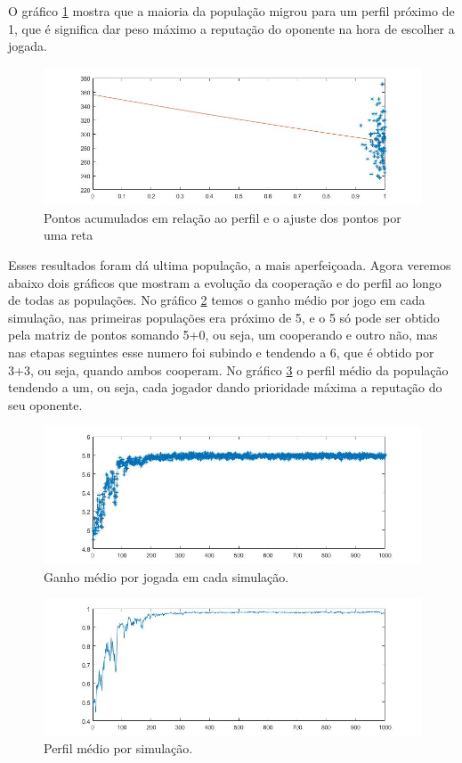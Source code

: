 O gráfico \ref{fig16} mostra que a maioria da população migrou para um perfil próximo de 1, que é significa dar peso máximo a reputação do oponente na hora de escolher a jogada.

\begin{figure}[H]
\centering
\includegraphics[width=14cm]{imagens/graf16.jpg}
\caption{Pontos acumulados em relação ao perfil e o ajuste dos pontos por uma reta}
\label{fig16}
\end{figure}

Esses resultados foram dá ultima população, a mais aperfeiçoada. Agora veremos abaixo dois gráficos que mostram a evolução da cooperação e do perfil ao longo de todas as populações. No gráfico \ref{fig17} temos o ganho médio por jogo em cada simulação, nas primeiras populações era próximo de 5, e o 5 só pode ser obtido pela matriz de pontos somando 5+0, ou seja, um cooperando e outro não, mas nas etapas seguintes esse numero foi subindo e tendendo a 6, que é obtido por 3+3, ou seja, quando ambos cooperam. No gráfico \ref{fig18} o perfil médio da população tendendo a um, ou seja, cada jogador dando prioridade máxima a reputação do seu oponente.

\begin{figure}[H]
\centering
\includegraphics[width=14cm]{imagens/graf17.jpg}
\caption{Ganho médio por jogada em cada simulação.}
\label{fig17}
\end{figure}

\begin{figure}[H]
\centering
\includegraphics[width=14cm]{imagens/graf18.jpg}
\caption{Perfil médio por simulação.}
\label{fig18}
\end{figure}


